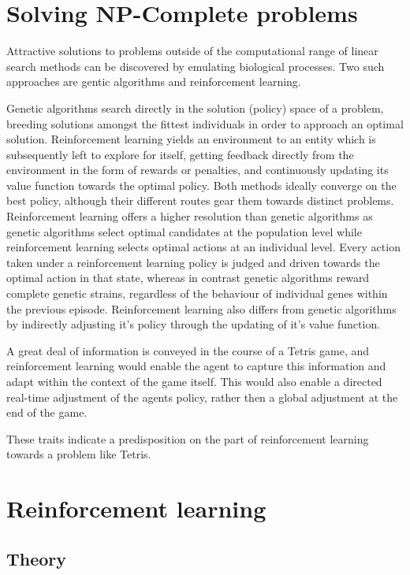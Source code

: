 \documentclass{rucsthesis}
\begin{document}
\section{Solving NP-Complete problems}

Attractive solutions to problems outside of the computational range of linear search methods can be discovered by emulating biological processes. Two such approaches are gentic algorithms and reinforcement learning. 

Genetic algorithms search directly in the solution (policy) space of a problem, breeding solutions amongst the fittest individuals in order to approach an optimal solution. Reinforcement learning yields an environment to an entity which is subsequently left to explore for itself, getting feedback directly from the environment in the form of rewards or penalties, and continuously updating its value function towards the optimal policy. Both methods ideally converge on the best policy\citep{evvsrl}, although their different routes gear them towards distinct problems. Reinforcement learning offers a higher resolution than genetic algorithms as genetic algorithms select optimal candidates at the population level while reinforcement learning  selects optimal actions at an individual level\citep{evvsrl}. Every action taken under a reinforcement learning policy is judged and driven towards the optimal action in that state, whereas in contrast genetic algorithms reward complete genetic strains, regardless of the behaviour of individual genes within the previous episode. Reinforcement learning also differs from genetic algorithms by indirectly adjusting it's policy through the updating of it's value function. 

A great deal of information is conveyed in the course of a Tetris game, and reinforcement learning would enable the agent to capture this information and adapt within the context of the game itself. This would also enable a directed real-time adjustment of the agents policy, rather then a global adjustment at the end of the game. 

These traits indicate a predisposition on the part of reinforcement learning towards a problem like Tetris.

\section{Reinforcement learning}
\subsection{Theory}
\end{document}
